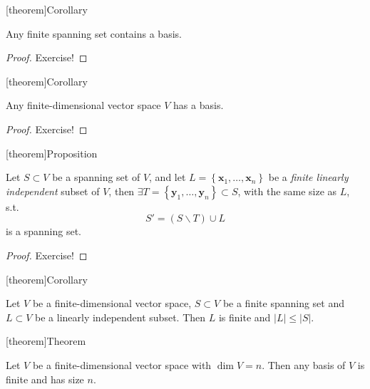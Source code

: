 \documentclass[12pt]{report}
\theoremstyle{definition}
\begin{document}
[theorem]{Corollary}
\begin{any finite spanning set contains a basis}
    Any finite spanning set contains a basis.
\end{any finite spanning set contains a basis}

\begin{proof}
    Exercise!
\end{proof}

[theorem]{Corollary}
\begin{any finite-dimensional v has a basis}
Any finite-dimensional vector space $V$ has a basis.
\end{any finite-dimensional v has a basis}

\begin{proof}
    Exercise!
\end{proof}

[theorem]{Proposition}
\begin{Steinitz exchange lemma}
Let $S \subset V$ be a spanning set of $V$, and let $L = \left\{\pmb{x}_1, \ldots, \pmb{x}_n\right\} $
be a \emph{finite linearly independent} subset of $V$, then 
$\exists T = \left\{\pmb{y}_1,\ldots,\pmb{y}_n\right\} \subset S$, with the same size as $L$, s.t.\[
    S' = (S\backslash T)\cup L
\]is a spanning set.
\end{Steinitz exchange lemma}

\begin{proof}
    Exercise!
\end{proof}

[theorem]{Corollary}
\begin{finite spanning set and linearly independent set}
    Let $V$ be a finite-dimensional vector space, $S \subset V$ be a finite spanning set
    and $L \subset V$ be a linearly independent subset.
    Then $L$ is finite and $|L| \le |S|$.
\end{finite spanning set and linearly independent set}

[theorem]{Theorem}
\begin{dimension and basis}
    Let $V$ be a finite-dimensional vector space with $\dim{V} = n$.
    Then any basis of $V$ is finite and has size $n$.
\end{dimension and basis}
\end{document}
